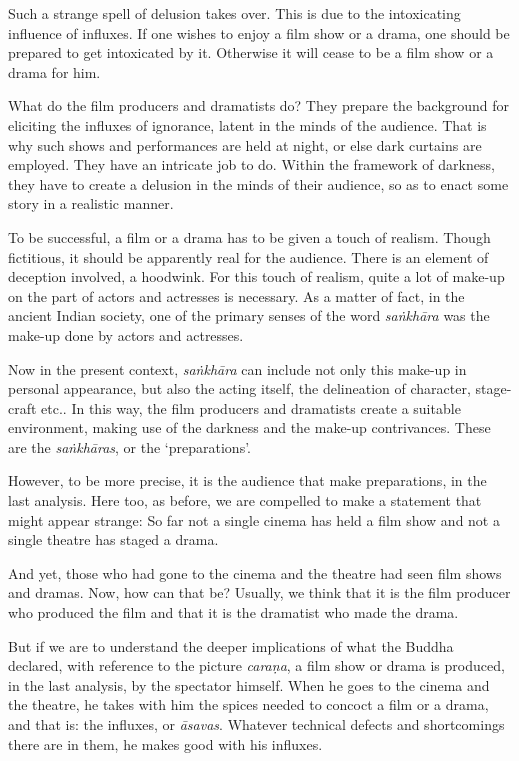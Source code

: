 Such a strange spell of delusion takes over. This is due to the intoxicating influence of influxes. If one wishes to enjoy a film show or a drama, one should be prepared to get intoxicated by it. Otherwise it will cease to be a film show or a drama for him.

What do the film producers and dramatists do? They prepare the background for eliciting the influxes of ignorance, latent in the minds of the audience. That is why such shows and performances are held at night, or else dark curtains are employed. They have an intricate job to do. Within the framework of darkness, they have to create a delusion in the minds of their audience, so as to enact some story in a realistic manner.

To be successful, a film or a drama has to be given a touch of realism. Though fictitious, it should be apparently real for the audience. There is an element of deception involved, a hoodwink. For this touch of realism, quite a lot of make-up on the part of actors and actresses is necessary. As a matter of fact, in the ancient Indian society, one of the primary senses of the word \emph{saṅkhāra} was the make-up done by actors and actresses.

Now in the present context, \emph{saṅkhāra} can include not only this make-up in personal appearance, but also the acting itself, the delineation of character, stage-craft etc.. In this way, the film producers and dramatists create a suitable environment, making use of the darkness and the make-up contrivances. These are the \emph{saṅkhāras}, or the `preparations'.

However, to be more precise, it is the audience that make preparations, in the last analysis. Here too, as before, we are compelled to make a statement that might appear strange: So far not a single cinema has held a film show and not a single theatre has staged a drama.

And yet, those who had gone to the cinema and the theatre had seen film shows and dramas. Now, how can that be? Usually, we think that it is the film producer who produced the film and that it is the dramatist who made the drama.

But if we are to understand the deeper implications of what the Buddha declared, with reference to the picture \emph{caraṇa}, a film show or drama is produced, in the last analysis, by the spectator himself. When he goes to the cinema and the theatre, he takes with him the spices needed to concoct a film or a drama, and that is: the influxes, or \emph{āsavas}. Whatever technical defects and shortcomings there are in them, he makes good with his influxes.

